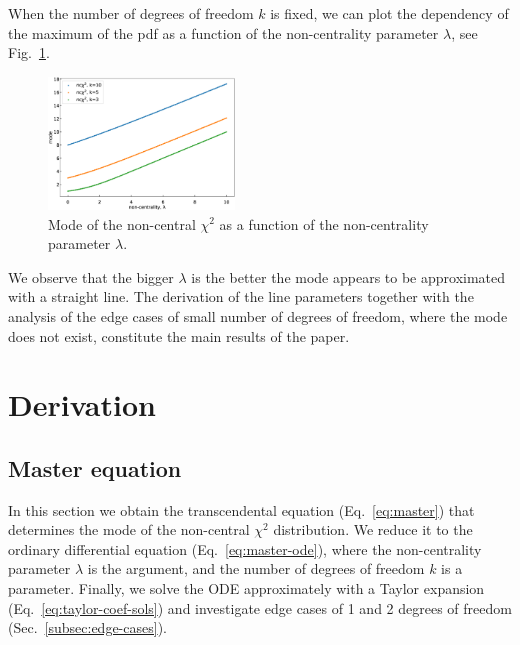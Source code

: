 \documentclass{amsart}
\numberwithin{equation}{section}
\begin{document}
When the number of degrees of freedom $k$ is fixed, we can plot the dependency of the maximum of the pdf as a function of the non-centrality parameter $\lambda$, see Fig.~\ref{fig:ncx2-max}.

\begin{figure}[h]
	\centering
	\includegraphics[width=0.44\textwidth]{ncx2-max.eps}
	\caption{Mode of the non-central $\chi^2$ as a function of the non-centrality parameter $\lambda$.}\label{fig:ncx2-max}
\end{figure}

We observe that the bigger $\lambda$ is the better the mode appears to be approximated with a straight line. The derivation of the line parameters together with the analysis of the edge cases of small number of degrees of freedom, where the mode does not exist, constitute the main results of the paper.

\section{Derivation}

\subsection{Master equation}
In this section we obtain the transcendental equation (Eq.~\ref{eq:master}) that determines the mode of the non-central $\chi^2$ distribution. We reduce it to the ordinary differential equation (Eq.~\ref{eq:master-ode}), where the non-centrality parameter $\lambda$ is the argument, and the number of degrees of freedom $k$ is a parameter. Finally, we solve the ODE approximately with a Taylor expansion (Eq.~\ref{eq:taylor-coef-sols}) and investigate edge cases of 1 and 2 degrees of freedom (Sec.~\ref{subsec:edge-cases}).
\end{document}
